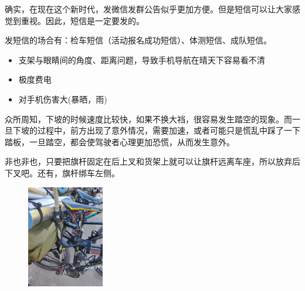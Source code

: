 \documentclass{ctexbook}
\begin{document}
\begin{tcolorbox}[title=为什么要发短信]
    确实，在现在这个新时代，发微信发群公告似乎更加方便。但是短信可以让大家感觉到重视。因此，短信是一定要发的。

    发短信的场合有：检车短信（活动报名成功短信）、体测短信、成队短信。
\end{tcolorbox}
\begin{tcolorbox}[title=为什么不能吃饺子/面]

\end{tcolorbox}
\begin{tcolorbox}[title=为什么拉练的过程中不能推车]

\end{tcolorbox}
\begin{tcolorbox}[title=为什么要坐硬座]

\end{tcolorbox}
\begin{tcolorbox}[title=为什么不推荐把手机放在手机支架上导航]
\begin{itemize}
\item 支架与眼睛间的角度、距离问题，导致手机导航在晴天下容易看不清
\item 极度费电
\item 对手机伤害大(暴晒，雨)
\end{itemize}

\end{tcolorbox}
\begin{tcolorbox}[title=为什么下坡的时候要把档位调大]
    众所周知，下坡的时候速度比较快，如果不换大裆，很容易发生踏空的现象。而一旦下坡的过程中，前方出现了意外情况，需要加速，或者可能只是慌乱中踩了一下踏板，一旦踏空，都会使驾驶者心理更加恐慌，从而发生意外。
\end{tcolorbox}
\begin{tcolorbox}[title=驮包与旗杆不相容？]
非也非也，只要把旗杆固定在后上叉和货架上就可以让旗杆远离车座，所以放弃后下叉吧。还有，旗杆绑车左侧。
       \begin{figure}[H]
            \begin{center} 
            \includegraphics[width=0.3\textwidth]{fig/驮包和大旗}
            \end{center}
        \end{figure}
\end{tcolorbox}
\end{document}
